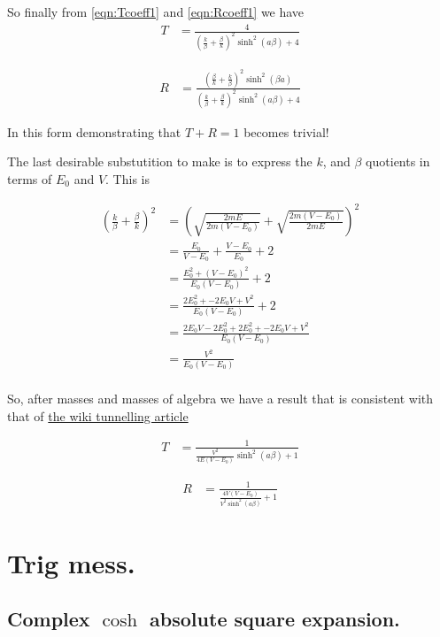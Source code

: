 \documentclass{article}
\begin{document}
So finally from \ref{eqn:Tcoeff1} and \ref{eqn:Rcoeff1} we have
\begin{align}
T 
&= \frac{4} { 
\left( \frac{k}{\beta} +\frac{\beta}{k} \right)^2 
\sinh^2(a \beta) + 4
}
\end{align}

\begin{align}
R 
&= \frac{ 
\left(\frac{\beta}{k} + \frac{k}{\beta} \right)^2 
\sinh^2( \beta a)} { 
\left( \frac{k}{\beta} +\frac{\beta}{k} \right)^2 
\sinh^2(a \beta) + 4 
}
\end{align}

In this form demonstrating that $T + R=1$ becomes trivial!

The last desirable substutition to make is to express the $k$, and $\beta$ quotients in terms of $E_0$ and $V$.  This is

\begin{align*}
\left(\frac{k}{\beta} + \frac{\beta}{k}\right)^2
&=
\left(\sqrt{\frac{2mE}{2m(V-E_0)}} + \sqrt{\frac{2m(V-E_0)}{2mE}}\right)^2 \\
&=
\frac{E_0}{V-E_0} + \frac{V-E_0}{E_0} + 2 \\
&=
\frac{E_0^2 + (V-E_0)^2}{E_0(V-E_0)} + 2 \\
&=
\frac{2 E_0^2 + -2 E_0 V + V^2 }{E_0(V-E_0)} + 2 \\
&=
\frac{2 E_0 V -2 E_0^2 + 2 E_0^2 + -2 E_0 V + V^2 }{E_0(V-E_0)} \\
&=
\frac{V^2 }{E_0(V-E_0)} \\
\end{align*}

So, after masses and masses of algebra we have a result that is consistent with that of
\href{http://en.wikipedia.org/wiki/Potential_barrier}{the wiki tunnelling article}

\begin{align}
T 
&= \frac{1} { \frac{V^2}{4E(V-E_0)} \sinh^2(a \beta) + 1 }
\end{align}

\begin{align}
R 
&= \frac{1} { \frac{4V(V-E_0)}{V^2 \sinh^2(a \beta)} + 1 }
\end{align}

\section{ Trig mess. }

\subsection{ Complex $\cosh$ absolute square expansion. }
\end{document}
